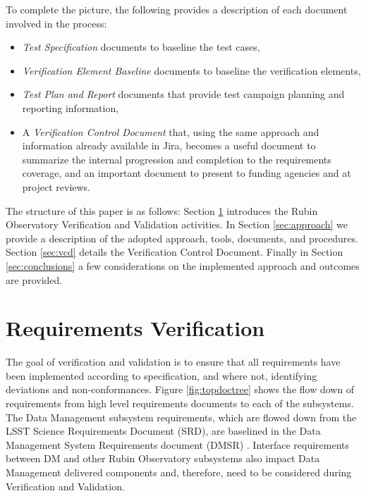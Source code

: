 To complete the picture, the following provides a description of each document involved in the process:
\begin{itemize}
\item  {\textit{Test Specification} documents to baseline the test cases, }
\item {\textit{Verification Element Baseline} documents to baseline the verification elements,}
\item  {\textit{Test Plan and Report} documents that provide test campaign planning and reporting information,}
\item  {A \textit{Verification Control Document} that, using the same approach and information already available in Jira, becomes a useful document to summarize the  internal progression and completion to the requirements coverage, and an important document to present to funding agencies and at project reviews. }
\end{itemize}

The structure of this paper is as follows:  Section \ref{sec:vandvproblem} introduces the Rubin Observatory Verification and Validation activities.
In Section \ref{sec:approach} we provide a description of the adopted approach, tools, documents, and procedures. 
Section \ref{sec:vcd} details the Verification Control Document. 
Finally in Section \ref{sec:conclusions} a few considerations on the implemented approach and outcomes are provided.

\section{Requirements Verification}
\label{sec:vandvproblem}
The goal of verification and validation is to ensure that all requirements have been implemented according to specification, and where not, identifying deviations and non-conformances. 
Figure \ref{fig:topdoctree} shows the flow down of requirements from high level requirements documents to each of the subsystems. 
The Data Management subsystem requirements, which are flowed down from the LSST Science Requirements Document (SRD)\cite{LPM-17}, are baselined in the Data Management System Requirements document (DMSR) \cite{LSE-61}.
Interface requirements between DM and other Rubin Observatory subsystems also impact Data Management delivered components and, therefore, need to be considered during Verification and Validation.

